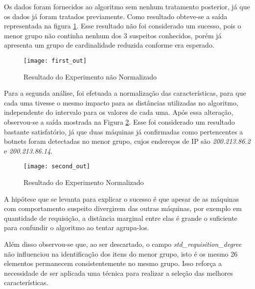 Os dados foram fornecidos ao algoritmo sem nenhum tratamento posterior, já que os dados já foram tratados previamente. Como resultado obteve-se a saída representada na figura \ref{fig:first_out}. Esse resultado não foi considerado um sucesso, pois o menor grupo não continha nenhum dos 3 suspeitos conhecidos, porém já apresenta um grupo de cardinalidade reduzida conforme era esperado.

\begin{figure}[htbp]
\centering
\texttt{[image: first\_out]}
\caption[Resultado do Experimento não Normalizado]{Resultado do Experimento não Normalizado} \label{fig:first_out}
\end{figure}

Para a segunda análise, foi efetuada a normalização das características, para que cada uma tivesse o mesmo impacto para as distâncias utilizadas no algoritmo, independente do intervalo para os valores de cada uma. Após essa alteração, observou-se a saída mostrada na Figura \ref{fig:second_out}. Esse foi considerado um resultado bastante satisfatório, já que duas máquinas já confirmadas como pertencentes a botnets foram detectadas no menor grupo, cujos endereços de IP são \textit{200.213.86.2} e \textit{200.213.86.14}.

\begin{figure}[htbp]
\centering
\texttt{[image: second\_out]}
\caption[Resultado do Experimento Normalizado]{Resultado do Experimento Normalizado} \label{fig:second_out}
\end{figure}

A hipótese que se levanta para explicar o sucesso é que apesar de as máquinas com comportamento suspeito divergirem das outras máquinas, por exemplo em quantidade de requisição, a distância marginal entre elas é grande o suficiente para confundir o algoritmo ao tentar agrupa-los.

Além disso observou-se que, ao ser descartado, o campo \textit{std\_requisition\_degree} não influenciou na identificação dos itens do menor grupo, isto é os mesmo 26 elementos permanecem consistentemente no mesmo grupo. Isso reforça a necessidade de ser aplicada uma técnica para realizar a seleção das melhores características.